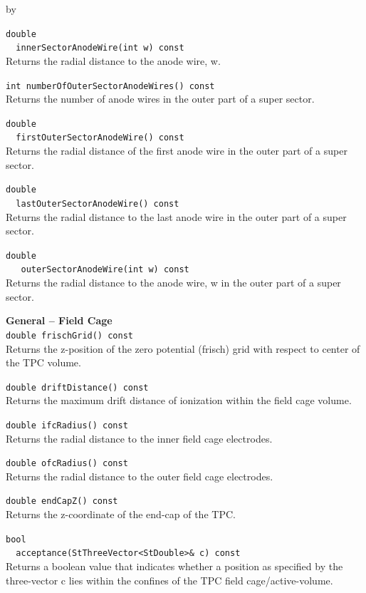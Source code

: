 \documentclass[twoside]{article}
\newcommand{\entrylabel}[1]{\mbox{\textbf{{#1}}}\hfil}%
\newenvironment{entry}
{\begin{list}{}%
    {\renewcommand{\makelabel}{\entrylabel}%
     \setlength{\labelwidth}{90pt}%
     \setlength{\leftmargin}{\labelwidth}
     \advance\leftmargin by \labelsep%
      }%
    }%
  {\end{list}}
\newcommand{\Entrylabel}[1]%
{\raisebox{0pt}[1ex][0pt]{\makebox[\labelwidth][l]%
    {\parbox[t]{\labelwidth}{\hspace{0pt}\textbf{{#1}}}}}}
\newenvironment{Entry}%
{\renewcommand{\entrylabel}{\Entrylabel}\begin{entry}}%
  {\end{entry}}
\begin{document}
\begin{Entry}
  \verb+double+\\
  \verb+  innerSectorAnodeWire(int w) const+\\
  Returns the radial distance to the anode wire, w.

  \verb+int numberOfOuterSectorAnodeWires() const+\\
  Returns the number of anode wires in the outer part
  of a super sector.

  \verb+double+\\
  \verb+  firstOuterSectorAnodeWire() const+\\
  Returns the radial distance of the first anode wire in
  the outer part of a super sector.

  \verb+double+\\
  \verb+  lastOuterSectorAnodeWire() const+\\
  Returns the radial distance to the last anode wire in the outer
  part of a super sector.

  \verb+double+\\
  \verb+   outerSectorAnodeWire(int w) const+\\
  Returns the radial distance to the anode wire, w in the outer part
  of a super sector.
    
  {\bf General -- Field Cage \\}
  \verb+double frischGrid() const+\\
  Returns the z-position of the zero potential (frisch) grid
  with respect to center of the TPC volume.

  \verb+double driftDistance() const+\\
  Returns the maximum drift distance of ionization within
  the field cage volume.
    
  \verb+double ifcRadius() const+\\
  Returns the radial distance to the inner field cage electrodes.

  \verb+double ofcRadius() const+\\
  Returns the radial distance to the outer field cage electrodes.

  \verb+double endCapZ() const+\\
  Returns the z-coordinate of the end-cap of the TPC.

  \verb+bool+\\
  \verb+  acceptance(StThreeVector<StDouble>& c) const+\\
  Returns a boolean value that indicates whether a position
  as specified by the three-vector c lies within the confines
  of the TPC field cage/active-volume.


\end{Entry}
\end{document}
